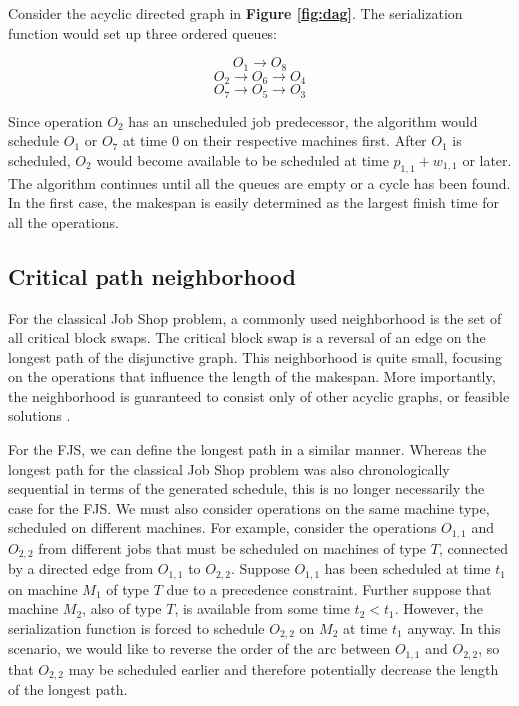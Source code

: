 \documentclass[a4paper,10pt]{article}
\begin{document}
Consider the acyclic directed graph in \textbf{Figure \ref{fig:dag}}. The serialization function would set up three ordered queues:

\[ O_1 \rightarrow O_8 \]
\[ O_2 \rightarrow O_6 \rightarrow O_4 \]
\[ O_7 \rightarrow O_5 \rightarrow O_3 \]

Since operation $O_2$ has an unscheduled job predecessor, the algorithm would schedule $O_1$ or $O_7$ at time 0 on their respective machines first. After $O_1$ is scheduled, $O_2$ would become available to be scheduled at time $p_{1,1} + w_{1,1}$ or later. The algorithm continues until all the queues are empty or a cycle has been found. In the first case, the makespan is easily determined as the largest finish time for all the operations.

\subsection{Critical path neighborhood}

For the classical Job Shop problem, a commonly used neighborhood is the set of all critical block swaps. The critical block swap is a reversal of an edge on the longest path of the disjunctive graph. This neighborhood is quite small, focusing on the operations that influence the length of the makespan. More importantly, the neighborhood is guaranteed to consist only of other acyclic graphs, or feasible solutions \cite{simulatedannealingjsp}.

For the FJS, we can define the longest path in a similar manner. Whereas the longest path for the classical Job Shop problem was also chronologically sequential in terms of the generated schedule, this is no longer necessarily the case for the FJS. We must also consider operations on the same machine type, scheduled on different machines. For example, consider the operations $O_{1,1}$ and $O_{2,2}$ from different jobs that must be scheduled on machines of type $T$, connected by a directed edge from $O_{1,1}$ to $O_{2,2}$. Suppose $O_{1,1}$ has been scheduled at time $t_1$ on machine $M_1$ of type $T$ due to a precedence constraint. Further suppose that machine $M_2$, also of type $T$, is available from some time $t_2 < t_1$. However, the serialization function is forced to schedule $O_{2,2}$ on $M_2$ at time $t_1$ anyway. In this scenario, we would like to reverse the order of the arc between $O_{1,1}$ and $O_{2,2}$, so that $O_{2,2}$ may be scheduled earlier and therefore potentially decrease the length of the longest path.
\end{document}
